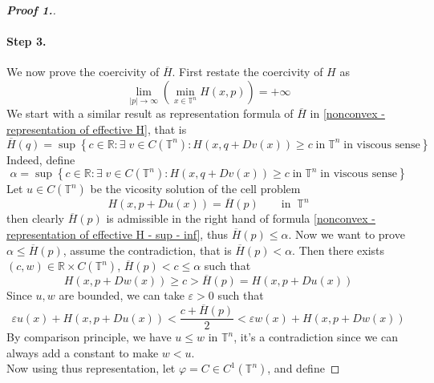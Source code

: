 \documentclass[12pt, oneside]{amsart}  	%
\begin{document}
\begin{proof}[\textbf{Proof 1.}]
\paragraph{\textbf{Step 3.}} We now prove the coercivity of $\overline{H}$. First restate the coercivity of $H$ as
\begin{equation}\label{rewrite the uniformly in x coercivity of H}
\lim_{|p|\longrightarrow\infty} \left( \min_{x\in \mathbb{T}^n} H(x,p)\right) = +\infty
\end{equation}
We start with a similar result as representation formula of $\overline{H}$ in \eqref{nonconvex - representation of effective H}, that is
\begin{equation}\label{nonconvex - representation of effective H - sup - inf}
\overline{H}(q) = \sup \left\lbrace c\in \mathbb{R}: \exists\;v\in C(\mathbb{T}^n): H(x,q+Dv(x))\geq c\;\text{in}\;\mathbb{T}^n\;\text{in viscous sense}\right\rbrace 
\end{equation}
Indeed, define 
\begin{equation*}
\alpha = \sup \left\lbrace c\in \mathbb{R}: \exists\;v\in C(\mathbb{T}^n): H(x,q+Dv(x))\geq c\;\text{in}\;\mathbb{T}^n\;\text{in viscous sense}\right\rbrace 
\end{equation*}
Let $u\in C(\mathbb{T}^n)$ be the vicosity solution of the cell problem
\begin{equation*}
H(x,p+Du(x)) = \overline{H}(p) \qquad\text{in}\;\;\mathbb{T}^n
\end{equation*}
then clearly $\overline{H}(p)$ is admissible in the right hand of formula \eqref{nonconvex - representation of effective H - sup - inf}, thus $\overline{H}(p) \leq \alpha$. Now we want to prove $\alpha \leq \overline{H}(p)$, assume the contradiction, that is $\overline{H}(p) < \alpha$. Then there exists $(c,w)\in \mathbb{R}\times C(\mathbb{T}^n)$, $\overline{H}(p) < c \leq \alpha$ such that
\begin{equation*}
H(x,p+Dw(x)) \geq c >\overline{H}(p) = H(x,p+Du(x))
\end{equation*}
Since $u,w$ are bounded, we can take $\varepsilon>0$ such that
\begin{equation*}
\varepsilon u(x) +H(x,p+Du(x)) < \frac{c+\overline{H}(p)}{2} < \varepsilon w(x) + H(x,p+Dw(x))
\end{equation*}
By comparison principle, we have $u\leq w$ in $\mathbb{T}^n$, it's  a contradiction since we can always add a constant to make $w<u$.\\
Now using thus representation, let $\varphi = C\in  C^1(\mathbb{T}^n)$, and define 

\end{proof}
\end{document}
